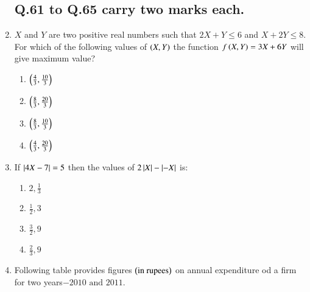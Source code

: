 \documentclass[journal]{IEEEtran}
\begin{document}
\begin{enumerate}
\subsection{\textbf{Q.61 to Q.65 carry two marks each.}}
\item $X$ and $Y$ are two positive real numbers such that $2X + Y \leq 6$ and $X + 2Y \leq8.$ For which of the following values of $\left(X,Y\right)$ the function $f\left(X,Y\right) = 3X + 6Y$ will give maximum value?
\begin{enumerate}
    \item $\left(\frac{4}{3},\frac{10}{3}\right)$
    \item $\left(\frac{8}{3},\frac{20}{3}\right)$
    \item $\left(\frac{8}{3},\frac{10}{3}\right)$
    \item $\left(\frac{4}{3},\frac{20}{3}\right)$
\end{enumerate}
\item If $\left\vert4X - 7\right\vert = 5$ then the values of $2\left\vert X\right\vert - \left\vert-X\right\vert$ is:
\begin{multicols}{4}
\begin{enumerate}
    \item $2,\frac{1}{3}$
    \item $\frac{1}{2},3$
    \item $\frac{3}{2},9$
    \item $\frac{2}{3},9$
\end{enumerate}
\end{multicols}
\item Following table provides figures $\left(\text{in rupees}\right)$ on annual expenditure od a firm for two years$-2010 \text{ and } 2011$.\\


\end{enumerate}
\end{document}

